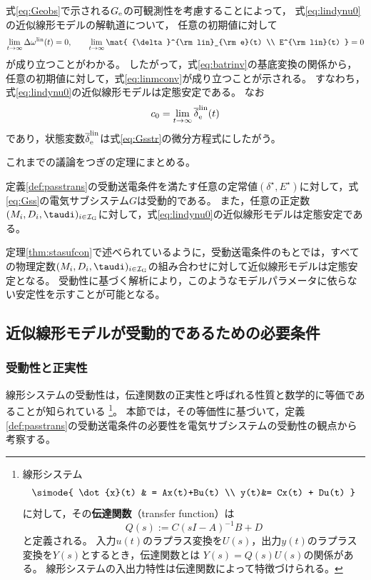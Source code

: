 \documentclass[tombow,dvipdfmx]{corona-a5-1.1}
\begin{document}
式\ref{eq:Geobs}で示される$G_{\rm e}$の可観測性を考慮することによって，
式\ref{eq:lindynu0}の近似線形モデルの解軌道について，
任意の初期値に対して
\begin{align}\label{eq:allzero}
\lim_{t\rightarrow \infty} \Delta \omega^{\rm lin}(t)  =0,\qquad
\lim_{t\rightarrow \infty} \mat{
{\delta}^{\rm lin}_{\rm e}(t)   \\
E^{\rm lin}(t)  
}
 =0
\end{align}
が成り立つことがわかる。
したがって，式\ref{eq:batrinv}の基底変換の関係から，任意の初期値に対して，式\ref{eq:linmconv}が成り立つことが示される。
すなわち，式\ref{eq:lindynu0}の近似線形モデルは定態安定である。
なお
\[
c_0 = \lim_{t\rightarrow \infty}\overline{\delta}^{\rm lin}_{\rm e}(t)
\]
であり，状態変数$\overline{\delta}^{\rm lin}_{\rm e}$は式\ref{eq:Gsstr}の微分方程式にしたがう。

これまでの議論をつぎの定理にまとめる。

\begin{定理}[受動性に基づく近似線形モデルの定態安定性]\label{thm:stasufcon}
定義\ref{def:passtrans}の受動送電条件を満たす任意の定常値$(\delta^{\star},E^{\star})$に対して，式\ref{eq:Gss}の電気サブシステム$G$は受動的である。
また，任意の正定数$(M_i,D_i,\taudi )_{i \in \mathcal{I}_{\rm G}}$に対して，式\ref{eq:lindynu0}の近似線形モデルは定態安定である。
\end{定理}

定理\ref{thm:stasufcon}で述べられているように，受動送電条件のもとでは，すべての物理定数$(M_i,D_i,\taudi )_{i \in \mathcal{I}_{\rm G}}$の組み合わせに対して近似線形モデルは定態安定となる。
受動性に基づく解析により，このようなモデルパラメータに依らない安定性を示すことが可能となる。



\subsection{近似線形モデルが受動的であるための必要条件\advanced}\label{sec:nesconana}

\smallskip
\subsubsection{受動性と正実性}

線形システムの受動性は，伝達関数の正実性と呼ばれる性質と数学的に等価であることが知られている
\footnote{
線形システム
\begin{align*}
\simode{
\dot{x}(t) & = Ax(t)+Bu(t) \\
y(t)&= Cx(t) + Du(t)
}
\end{align*}
に対して，その\textbf{伝達関数}（transfer function）は
\[
Q(s):=C(sI-A)^{-1}B +D
\]
と定義される。
入力$u(t)$のラプラス変換を$U(s)$，出力$y(t)$のラプラス変換を$Y(s)$とするとき，伝達関数とは
$Y(s)=Q(s)U(s)$の関係がある。
線形システムの入出力特性は伝達関数によって特徴づけられる。
}。
本節では，その等価性に基づいて，定義\ref{def:passtrans}の受動送電条件の必要性を電気サブシステムの受動性の観点から考察する。
\end{document}
